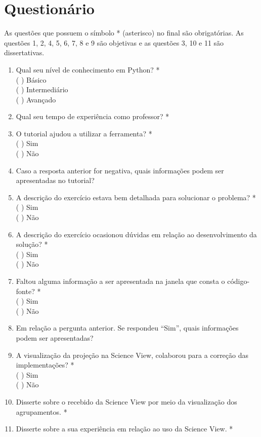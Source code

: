 \chapter{Questionário}
\label{apendice:questionario}

As questões que possuem o símbolo * (asterisco) no final são obrigatórias. As
questões 1, 2, 4, 5, 6, 7, 8 e 9 são objetivas e as questões 3, 10 e 11 são dissertativas.

\begin{enumerate}
	\item Qual seu nível de conhecimento em Python? *\\
	(  ) Básico\\
	(  ) Intermediário\\
	(  ) Avançado
	 	
	\item Qual seu tempo de experiência como professor? *
	
	\item O tutorial ajudou a utilizar a ferramenta? *\\
	(  ) Sim\\
	(  ) Não
	
	\item Caso a resposta anterior for negativa, quais informações podem ser apresentadas no tutorial?
	
	\item A descrição do exercício estava bem detalhada para solucionar o problema? *\\
	(  ) Sim\\
	(  ) Não
	
	\item A descrição do exercício ocasionou dúvidas em relação ao desenvolvimento da solução? *\\
	(  ) Sim\\
	(  ) Não
	
	\item Faltou alguma informação a ser apresentada na janela que consta o código-fonte? *\\
	(  ) Sim\\
	(  ) Não
	
	\item Em relação a pergunta anterior. Se respondeu ``Sim'', quais informações podem ser apresentadas?
	
	\item A visualização da projeção na Science View, colaborou para a correção das implementações? *\\
	(  ) Sim\\
	(  ) Não
	
	\item Disserte sobre o  recebido da Science View por meio da visualização dos agrupamentos. *
	
	\item Disserte sobre a sua experiência em relação ao uso da Science View. *
	
\end{enumerate}